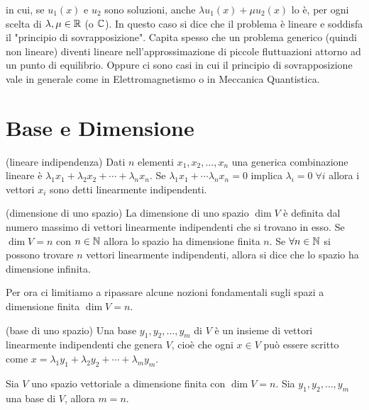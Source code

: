 in cui, se $u_1(x)$ e $u_2$ sono soluzioni, anche $\lambda u_1(x) + \mu u_2(x)$ lo è, per ogni scelta di $\lambda, \mu \in \mathbb R$ (o $\mathbb C$). In questo caso si dice che il problema è lineare e soddisfa il "principio di sovrapposizione". Capita spesso che un problema generico (quindi non lineare) diventi lineare nell'approssimazione di piccole fluttuazioni attorno ad un punto di equilibrio. Oppure ci sono casi in cui il principio di sovrapposizione vale in generale come in Elettromagnetismo o in Meccanica Quantistica.

\section{Base e Dimensione}

\begin{definition}{(lineare indipendenza)}
Dati $n$ elementi $x_1, x_2, \ldots, x_n$ una generica combinazione lineare è $\lambda_1 x_1 + \lambda_2 x_2 + \cdots + \lambda_n x_n$. Se $\lambda_1 x_1 + \cdots \lambda_n x_n = 0$ implica $\lambda_i = 0 \; \forall i$ allora i vettori $x_i$ sono detti linearmente indipendenti. 
\end{definition}

\begin{definition}{(dimensione di uno spazio)}
La dimensione di uno spazio $\dim{V}$ è definita dal numero massimo di vettori linearmente indipendenti che si trovano in esso. Se $\dim{V} = n$ con $n \in \mathbb N$ allora lo spazio ha dimensione finita $n$. Se $\forall n \in \mathbb N$ si possono trovare $n$ vettori linearmente indipendenti, allora si dice che lo spazio ha dimensione infinita.   
\end{definition}

Per ora ci limitiamo a ripassare alcune nozioni fondamentali sugli spazi a dimensione finita $\dim{V} = n$.

\begin{definition}{(base di uno spazio)}
Una base $y_1, y_2, \ldots , y_m$ di $V$ è un insieme di vettori linearmente indipendenti che genera $V$, cioè che ogni $x \in V$ può essere scritto come $x = \lambda_1 y_1 + \lambda_2 y_2 + \cdots + \lambda_m y_m$.
\end{definition}

\begin{theorem}
Sia $V$ uno spazio vettoriale a dimensione finita con $\dim{V} = n$. Sia $y_1, y_2, \ldots , y_m$ una base di $V$, allora $m=n$.
\end{theorem}

